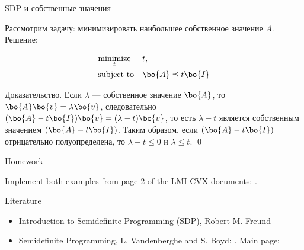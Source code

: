 \documentclass{beamer}
\begin{document}
\begin{frame}{SDP и собственные значения}
	\begin{flushleft}
		
		Рассмотрим задачу: минимизировать наибольшее собственное значение $A$. Решение:
		
		\begin{equation}
			\begin{aligned}
				& \underset{t}{\text{minimize}}
				& & t, \\
				& \text{subject to}
				& & \bo{A} \preceq t\bo{I}
			\end{aligned}
		\end{equation}
		
		Доказательство. Если $\lambda$ — собственное значение $\bo{A}$, то $\bo{A} \bo{v} = \lambda\bo{v}$, следовательно $(\bo{A} - t\bo{I}) \bo{v} = (\lambda - t)\bo{v}$, то есть $\lambda - t$ является собственным значением $(\bo{A} - t\bo{I})$. Таким образом, если $(\bo{A} - t\bo{I})$ отрицательно полуопределена, то $\lambda - t \leq 0$ и $\lambda \leq t$. \qed
		
	\end{flushleft}
\end{frame}




\begin{frame}{Homework}
\begin{flushleft}



Implement both examples from page 2 of the LMI CVX documents: .

\end{flushleft}
\end{frame}




\begin{frame}{Literature}
	\begin{flushleft}
		
		\begin{itemize}
			\item Introduction to Semidefinite Programming (SDP), Robert M. Freund 
			
			\item Semidefinite Programming, L. Vandenberghe and S. Boyd: . Main page: 
		\end{itemize}
		
		
		
	\end{flushleft}
\end{frame}
\end{document}
